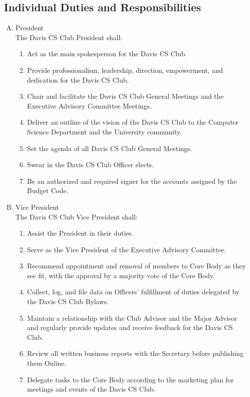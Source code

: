 \documentclass{article}
\newenvironment{li}{
\begin{enumerate}
  \setlength{\itemsep}{1pt}
  \setlength{\parskip}{0pt}
  \setlength{\parsep}{0pt}
}{\end{enumerate}}
\begin{document}
\subsection{Individual Duties and Responsibilities}
\begin{enumerate}[A.]
  \setlength{\itemsep}{1pt}
  \setlength{\parskip}{0pt}
  \setlength{\parsep}{0pt}
\item President\\
	The Davis CS Club President shall:
	\begin{li}
	\item Act as the main spokesperson for the Davis CS Club.
	\item Provide professionalism, leadership, direction, empowerment, and dedication for the Davis CS Club.
	\item Chair and facilitate the Davis CS Club General Meetings and the Executive Advisory Committee Meetings.
	\item Deliver an outline of the vision of the Davis CS Club to the Computer Science Department and the University community.
	\item Set the agenda of all Davis CS Club General Meetings.
	\item Swear in the Davis CS Club Officer elects.
	\item Be an authorized and required signer for the accounts assigned by the Budget Code.
	\end{li}
\item Vice President\\
	The Davis CS Club Vice President shall:
	\begin{li}
	\item Assist the President in their duties.
	\item Serve as the Vice President of the Executive Advisory Committee.
	\item Recommend appointment and removal of members to Core Body as they see fit, with the approval by a majority vote of the Core Body.
	\item Collect, log, and file data on Officers' fulfillment of duties delegated by the Davis CS Club Bylaws.
	\item Maintain a relationship with the Club Advisor and the Major Advisor and regularly provide updates and receive feedback for the Davis CS Club.
	\item Review all written business reports with the Secretary before publishing them Online.
	\item Delegate tasks to the Core Body according to the marketing plan for meetings and events of the Davis CS Club.


\end{li}
\end{enumerate}
\end{document}
